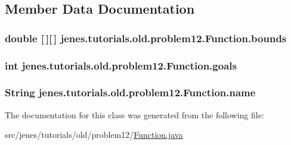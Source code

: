 \subsection{Member Data Documentation}
\hypertarget{classjenes_1_1tutorials_1_1old_1_1problem12_1_1_function_a0a732b2084fd09b6d69858b21a780a05}{
\subsubsection[{bounds}]{\setlength{\rightskip}{0pt plus 5cm}double \mbox{[}$\,$\mbox{]}\mbox{[}$\,$\mbox{]} jenes.\-tutorials.\-old.\-problem12.\-Function.\-bounds\hspace{0.3cm}{\ttfamily [protected]}}}\label{classjenes_1_1tutorials_1_1old_1_1problem12_1_1_function_a0a732b2084fd09b6d69858b21a780a05}
\hypertarget{classjenes_1_1tutorials_1_1old_1_1problem12_1_1_function_a9ad846e268721b5a9d5d3e15763d5400}{
\subsubsection[{goals}]{\setlength{\rightskip}{0pt plus 5cm}int jenes.\-tutorials.\-old.\-problem12.\-Function.\-goals\hspace{0.3cm}{\ttfamily [protected]}}}\label{classjenes_1_1tutorials_1_1old_1_1problem12_1_1_function_a9ad846e268721b5a9d5d3e15763d5400}
\hypertarget{classjenes_1_1tutorials_1_1old_1_1problem12_1_1_function_a6cc32f98e4932a3251cbaffdf08b9773}{
\subsubsection[{name}]{\setlength{\rightskip}{0pt plus 5cm}String jenes.\-tutorials.\-old.\-problem12.\-Function.\-name\hspace{0.3cm}{\ttfamily [protected]}}}\label{classjenes_1_1tutorials_1_1old_1_1problem12_1_1_function_a6cc32f98e4932a3251cbaffdf08b9773}


The documentation for this class was generated from the following file\-:\begin{DoxyCompactItemize}
\item 
src/jenes/tutorials/old/problem12/\hyperlink{_function_8java}{Function.\-java}\end{DoxyCompactItemize}
